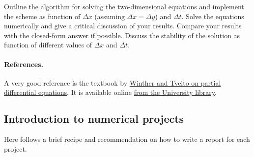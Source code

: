 \documentclass[%
oneside,                 %
final,                   %
10pt]{article}
\begin{document}
Outline the algorithm for solving the two-dimensional equations and
implement the scheme as function of $\Delta x$ (assuming $\Delta x =
\Delta y$) and $\Delta t$. Solve the equations numerically and give a
critical discussion of your results. Compare your results with the
closed-form answer if possible. Discuss the stability of the solution
as function of different values of $\Delta x$ and $\Delta t$.


\paragraph{References.}
A very good reference is the textbook by \href{{http://www.springer.com/us/book/9783540225515}}{Winther and Tveito on partial differential equations}. It is available online \href{{https://vpn2.uio.no/+CSCO+0h756767633A2F2F797661782E66636576617472652E70627A++/book/10.1007/b138016/page/1}}{from the University library}.


\subsection*{Introduction to numerical projects}

Here follows a brief recipe and recommendation on how to write a report for each
project.
\end{document}

